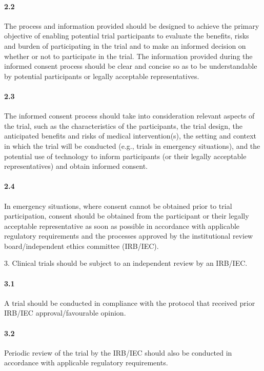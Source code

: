 \documentclass[11pt]{article}
\begin{document}
\paragraph{2.2} The process and information provided should be designed to achieve the primary objective of enabling potential trial participants to evaluate the benefits, risks and burden of participating in the trial and to make an informed decision on whether or not to participate in the trial. The information provided during the informed consent process should be clear and concise so as to be understandable by potential participants or legally acceptable representatives.

\paragraph{2.3} The informed consent process should take into consideration relevant aspects of the trial, such as the characteristics of the participants, the trial design, the anticipated benefits and risks of medical intervention(s), the setting and context in which the trial will be conducted (e.g., trials in emergency situations), and the potential use of technology to inform participants (or their legally acceptable representatives) and obtain informed consent.

\paragraph{2.4} In emergency situations, where consent cannot be obtained prior to trial participation, consent should be obtained from the participant or their legally acceptable representative as soon as possible in accordance with applicable regulatory requirements and the processes approved by the institutional review board/independent ethics committee (IRB/IEC).

3. Clinical trials should be subject to an independent review by an IRB/IEC.


\paragraph{3.1} A trial should be conducted in compliance with the protocol that received prior IRB/IEC approval/favourable opinion.

\paragraph{3.2} Periodic review of the trial by the IRB/IEC should also be conducted in accordance with applicable regulatory requirements.
\end{document}
